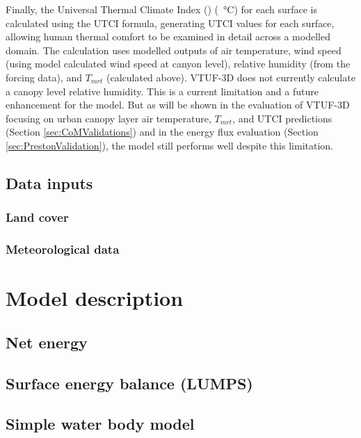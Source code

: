 \documentclass[final,3p,times,authoryear]{elsarticle}
\begin{document}
Finally, the Universal Thermal Climate Index () (\SI{}{\degreeCelsius}) for each surface is calculated using the \cite{Brode2009u} UTCI formula, generating UTCI values for each surface, allowing human thermal comfort to be examined in detail across a modelled domain. The calculation uses modelled outputs of air temperature, wind speed (using model calculated wind speed at canyon level), relative humidity (from the forcing data), and $T_{mrt}$ (calculated above). VTUF-3D does not currently calculate a canopy level relative humidity. This is a current limitation and a future enhancement for the model. But as will be shown in the evaluation of VTUF-3D focusing on urban canopy layer air temperature, $T_{mrt}$, and UTCI predictions (Section \ref{sec:CoMValidations}) and in the energy flux evaluation (Section \ref{sec:PrestonValidation}), the model still performs well despite this limitation. 




\subsection{Data inputs}\label{sec:datainputs}
\subsubsection{Land cover}\label{sec:landcover}



\subsubsection{Meteorological data}\label{sec:metdata}



\section{Model description}\label{sec:ModelDescription}
\subsection{Net energy}\label{sec:net}

\subsection{Surface energy balance (LUMPS)}\label{sec:lumps}


\subsection{Simple water body model}\label{sec:simplewater}
\end{document}
